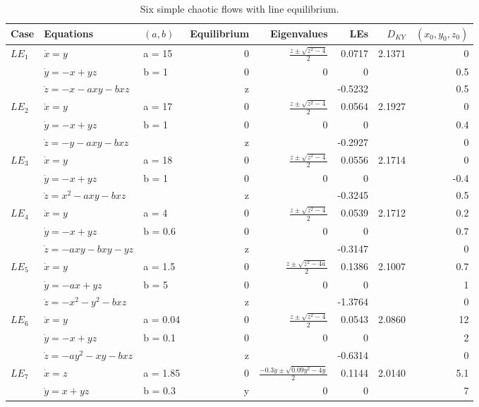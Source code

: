 \begin{table}[htb]
\caption{\label{tab:line_01}Six simple chaotic flows with line equilibrium.}
\centering
\begin{tabular}{lllrrrrr}
\hline
\hline
Case & Equations & \((a,b)\) & Equilibrium & Eigenvalues & LEs & \(D_{KY}\) & \((x_0,y_0,z_0)\)\\
\hline
\(LE_1\) & \(\dot{x} = y\) & a = 15 & 0 & \(\frac{z\pm\sqrt{z^2-4}}{2}\) & 0.0717 & 2.1371 & 0\\
 & \(\dot{y} = -x + yz\) & b = 1 & 0 & 0 & 0 &  & 0.5\\
 & \(\dot{z} = -x - axy - bxz\) &  & z &  & -0.5232 &  & 0.5\\
\hline
\(LE_2\) & \(\dot{x} = y\) & a = 17 & 0 & \(\frac{z\pm\sqrt{z^2-4}}{2}\) & 0.0564 & 2.1927 & 0\\
 & \(\dot{y} = -x + yz\) & b = 1 & 0 & 0 & 0 &  & 0.4\\
 & \(\dot{z} = -y - axy - bxz\) &  & z &  & -0.2927 &  & 0\\
\hline
\(LE_3\) & \(\dot{x} = y\) & a = 18 & 0 & $\frac{z\pm{}\sqrt{z^2-4}}{2}$ & 0.0556 & 2.1714 & 0\\
 & \(\dot{y} = -x + yz\) & b = 1 & 0 & 0 & 0 &  & -0.4\\
 & \(\dot{z} = x^2 - axy - bxz\) &  & z &  & -0.3245 &  & 0.5\\
\hline
\(LE_4\) & \(\dot{x} = y\) & a = 4 & 0 & $\frac{z\pm{}\sqrt{z^2-4}}{2}$ & 0.0539 & 2.1712 & 0.2\\
 & \(\dot{y} = -x + yz\) & b = 0.6 & 0 & 0 & 0 &  & 0.7\\
 & \(\dot{z} = -axy - bxy - yz\) &  & z &  & -0.3147 &  & 0\\
\hline
\(LE_5\) & \(\dot{x} = y\) & a = 1.5 & 0 & $\frac{z\pm{}\sqrt{z^2-4a}}{2}$ & 0.1386 & 2.1007 & 0.7\\
 & \(\dot{y} = -ax + yz\) & b = 5 & 0 & 0 & 0 &  & 1\\
 & \(\dot{z} = -x^2 - y^2 - bxz\) &  & z &  & -1.3764 &  & 0\\
\hline
\(LE_6\) & \(\dot{x} = y\) & a = 0.04 & 0 & $\frac{z\pm{}\sqrt{z^2-4}}{2}$ & 0.0543 & 2.0860 & 12\\
 & \(\dot{y} = -x + yz\) & b = 0.1 & 0 & 0 & 0 &  & 2\\
 & \(\dot{z} = -ay^2 - xy - bxz\) &  & z &  & -0.6314 &  & 0\\
\hline
\(LE_7\) & \(\dot{x} = z\) & a = 1.85 & 0 & $\frac{-0.3y\pm{}\sqrt{0.09y^2-4y}}{2}$ & 0.1144 & 2.0140 & 5.1\\
 & \(\dot{y} = x + yz\) & b = 0.3 & y & 0 & 0 &  & 7\\

\end{tabular}
\end{table}
